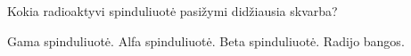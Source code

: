 \question Kokia radioaktyvi spinduliuotė pasižymi didžiausia skvarba? \begin{choices}
    \choice Gama spinduliuotė.
    \choice Alfa spinduliuotė.
    \choice Beta spinduliuotė.
    \choice Radijo bangos.
\end{choices}
